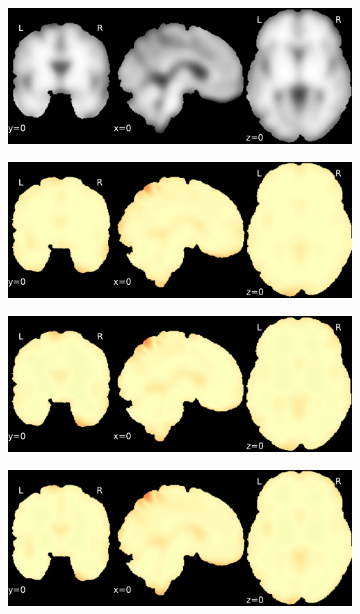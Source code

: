 \documentclass{article}
\begin{document}
\begin{landscape}
\begin{figure}
        \begin{subfigure}[t]{0.2\paperheight}
            \centering
            \includegraphics[width=\textwidth]{figures/sig/15mm/ieee_ds002338_sub-xp207.pdf}
        \end{subfigure}
        \begin{subfigure}[t]{0.2\paperheight}
            \centering
            \includegraphics[width=\textwidth]{figures/sig/15mm/rr_ds002338_sub-xp207_sig.pdf}
        \end{subfigure}
        \begin{subfigure}[t]{0.2\paperheight}
            \centering
            \includegraphics[width=\textwidth]{figures/sig/15mm/rs_ds002338_sub-xp207_sig.pdf}
        \end{subfigure}
        \begin{subfigure}[t]{0.2\paperheight}
            \centering
            \includegraphics[width=\textwidth]{figures/sig/15mm/rr.rs_ds002338_sub-xp207_sig.pdf}

\end{subfigure}
\end{figure}
\end{landscape}
\end{document}
